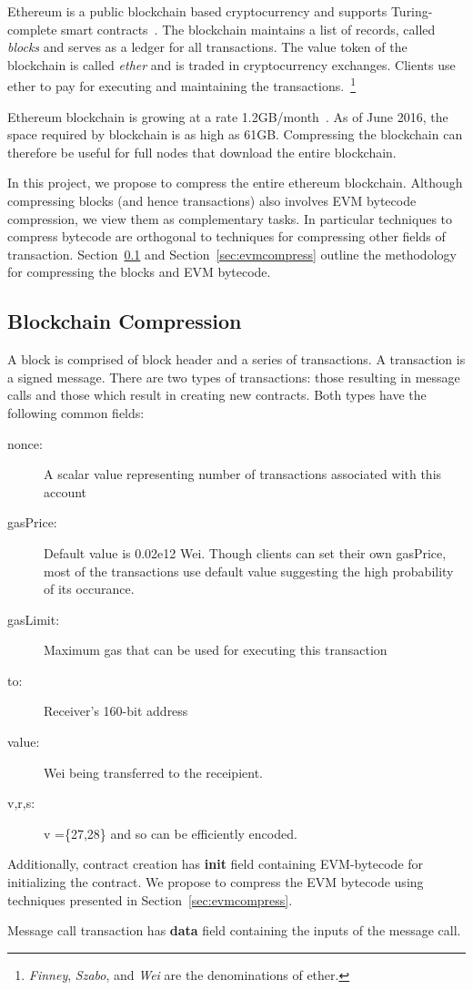 
Ethereum is a public blockchain based cryptocurrency and supports Turing-complete smart contracts~\cite{ethereum}.
The blockchain maintains a list of records, called \emph{blocks} and serves as a ledger for all transactions.
The value token of the blockchain is called \emph{ether} and 
is traded in cryptocurrency exchanges.
Clients use ether to pay for executing and maintaining the transactions.~\footnote{
\emph{Finney}, \emph{Szabo}, and \emph{Wei} are the denominations of ether.}
 
Ethereum blockchain is growing at a rate 1.2GB/month~\cite{ethdiskspace}.
As of June 2016, the space required by blockchain is as high as 61GB.
Compressing the blockchain can therefore be useful for full nodes that download the entire blockchain.

In this project, we propose to compress the entire ethereum blockchain. 
Although compressing blocks (and hence transactions) also involves EVM bytecode compression, 
we view them as complementary tasks. 
In particular techniques to compress bytecode are orthogonal to techniques for compressing other fields of transaction.
Section~\ref{sec:blockcompress} and 
Section~\ref{sec:evmcompress}  
outline the methodology for compressing the blocks and EVM bytecode.

\subsection{Blockchain Compression}\label{sec:blockcompress}

A block is comprised of block header and a series of transactions. A transaction is a signed message.
There are two types of transactions: those resulting in message calls and those which result in creating new contracts.
Both types have the following common fields:
\begin{description}
  \item[nonce:] A scalar value representing number of transactions associated with this account
  \item[gasPrice:] Default value is 0.02e12 Wei. Though clients can set their own gasPrice, most of the transactions use default value suggesting the high probability of its occurance.
  \item[gasLimit:] Maximum gas that can be used for executing this transaction
  \item[to:] Receiver's 160-bit address
  \item[value:] Wei being transferred to the receipient.
  \item[v,r,s:] v =\{27,28\} and so can be efficiently encoded.
\end{description}

Additionally, contract creation has \textbf{init} field containing EVM-bytecode for initializing the contract.
We propose to compress the EVM bytecode using techniques presented in Section~\ref{sec:evmcompress}. 

Message call transaction has \textbf{data} field containing the inputs of the message call.

%

